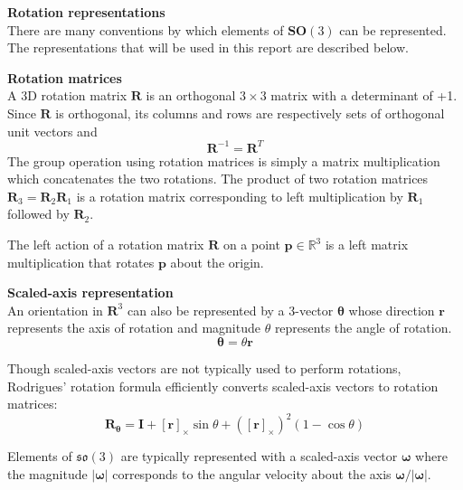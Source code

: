 		\textbf{Rotation representations}\\		
		There are many conventions by which elements of $\mathbf{SO}(3)$ can be represented. The representations that will be used in this report are described below.
		
		\textbf{Rotation matrices}\\
		A 3D rotation matrix $\mathbf{R}$ is an orthogonal $3 \times 3$ matrix with a determinant of +1. Since $\mathbf{R}$ is orthogonal, its columns and rows are respectively sets of orthogonal unit vectors and
		\begin{equation}
			\mathbf{R}^{-1} = \mathbf{R}^{T}
		\end{equation}		
		The group operation using rotation matrices is simply a matrix multiplication which concatenates the two rotations. The product of two rotation matrices $\mathbf{R}_3 = \mathbf{R}_2\mathbf{R}_1$ is a rotation matrix corresponding to left multiplication by $\mathbf{R}_1$ followed by $\mathbf{R}_2$.
		
		The left action of a rotation matrix $\mathbf{R}$ on a point $\mathbf{p} \in \mathbb{R}^3$ is a left matrix multiplication that rotates $\mathbf{p}$ about the origin.
		
		\textbf{Scaled-axis representation}\\
		An orientation in $\mathbf{R}^3$ can also be represented by a 3-vector $\bm{\theta}$ whose direction $\mathbf{r}$ represents the axis of rotation and magnitude $\theta$ represents the angle of rotation.
		\begin{equation}
			\bm{\theta} = \theta\mathbf{r}
		\end{equation}
		
		Though scaled-axis vectors are not typically used to perform rotations, Rodrigues' rotation formula efficiently converts scaled-axis vectors to rotation matrices:
		\begin{equation}
			\mathbf{R}_{\bm{\theta}} = \mathbf{I} + [\mathbf{r}]_{\times}\sin{\theta} + ([\mathbf{r}]_{\times})^2(1-\cos{\theta})
		\end{equation}
					
		Elements of $\mathfrak{so}(3)$ are typically represented with a scaled-axis vector $\bm{\omega}$ where the magnitude $|\bm{\omega}|$ corresponds to the angular velocity about the axis $\bm{\omega}/|\bm{\omega}|$.
					
